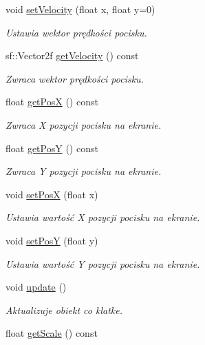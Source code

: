 \begin{DoxyCompactItemize}
void \mbox{\hyperlink{class_bullet_a2bb01459022a349fb8e7bd82d0a53283}{set\+Velocity}} (float x, float y=0)
\begin{DoxyCompactList}\small\item\em Ustawia wektor prędkości pocisku. \end{DoxyCompactList}\item 
sf\+::\+Vector2f \mbox{\hyperlink{class_bullet_a1b48210b12476530fcc4da1baf6cf44c}{get\+Velocity}} () const
\begin{DoxyCompactList}\small\item\em Zwraca wektor prędkości pocisku. \end{DoxyCompactList}\item 
float \mbox{\hyperlink{class_bullet_ab9d387e9b8149d347a63bc82cede9549}{get\+PosX}} () const
\begin{DoxyCompactList}\small\item\em Zwraca X pozycji pocisku na ekranie. \end{DoxyCompactList}\item 
float \mbox{\hyperlink{class_bullet_a06183fe0cba63d671a05fc8e19102966}{get\+PosY}} () const
\begin{DoxyCompactList}\small\item\em Zwraca Y pozycji pocisku na ekranie. \end{DoxyCompactList}\item 
void \mbox{\hyperlink{class_bullet_a3e9ef53d97f7f26289b2a6a7a62b2184}{set\+PosX}} (float x)
\begin{DoxyCompactList}\small\item\em Ustawia wartość X pozycji pocisku na ekranie. \end{DoxyCompactList}\item 
void \mbox{\hyperlink{class_bullet_a600b82ffa52d709ac44db182a2b02c78}{set\+PosY}} (float y)
\begin{DoxyCompactList}\small\item\em Ustawia wartość Y pozycji pocisku na ekranie. \end{DoxyCompactList}\item 
void \mbox{\hyperlink{class_bullet_a32f4a0611fe2dd245fee955d14ca1f68}{update}} ()
\begin{DoxyCompactList}\small\item\em Aktualizuje obiekt co klatke. \end{DoxyCompactList}\item 
float \mbox{\hyperlink{class_bullet_a252b146bfd709799990523fcbb0c6a4b}{get\+Scale}} () const

\end{DoxyCompactItemize}
